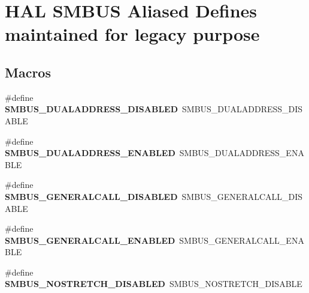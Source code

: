 \hypertarget{group___h_a_l___s_m_b_u_s___aliased___defines}{\section{H\-A\-L S\-M\-B\-U\-S Aliased Defines maintained for legacy purpose}
\label{group___h_a_l___s_m_b_u_s___aliased___defines}
}
\subsection*{Macros}
\begin{DoxyCompactItemize}
\item 
\hypertarget{group___h_a_l___s_m_b_u_s___aliased___defines_gaddbad34ded349c11686df6c08aa6471a}{\#define {\bfseries S\-M\-B\-U\-S\-\_\-\-D\-U\-A\-L\-A\-D\-D\-R\-E\-S\-S\-\_\-\-D\-I\-S\-A\-B\-L\-E\-D}~S\-M\-B\-U\-S\-\_\-\-D\-U\-A\-L\-A\-D\-D\-R\-E\-S\-S\-\_\-\-D\-I\-S\-A\-B\-L\-E}\label{group___h_a_l___s_m_b_u_s___aliased___defines_gaddbad34ded349c11686df6c08aa6471a}

\item 
\hypertarget{group___h_a_l___s_m_b_u_s___aliased___defines_ga40e0af7474fce8b9658f0bb0bd5dcdb5}{\#define {\bfseries S\-M\-B\-U\-S\-\_\-\-D\-U\-A\-L\-A\-D\-D\-R\-E\-S\-S\-\_\-\-E\-N\-A\-B\-L\-E\-D}~S\-M\-B\-U\-S\-\_\-\-D\-U\-A\-L\-A\-D\-D\-R\-E\-S\-S\-\_\-\-E\-N\-A\-B\-L\-E}\label{group___h_a_l___s_m_b_u_s___aliased___defines_ga40e0af7474fce8b9658f0bb0bd5dcdb5}

\item 
\hypertarget{group___h_a_l___s_m_b_u_s___aliased___defines_gac6c7ef3413e8533e140fda0f1c882a0e}{\#define {\bfseries S\-M\-B\-U\-S\-\_\-\-G\-E\-N\-E\-R\-A\-L\-C\-A\-L\-L\-\_\-\-D\-I\-S\-A\-B\-L\-E\-D}~S\-M\-B\-U\-S\-\_\-\-G\-E\-N\-E\-R\-A\-L\-C\-A\-L\-L\-\_\-\-D\-I\-S\-A\-B\-L\-E}\label{group___h_a_l___s_m_b_u_s___aliased___defines_gac6c7ef3413e8533e140fda0f1c882a0e}

\item 
\hypertarget{group___h_a_l___s_m_b_u_s___aliased___defines_ga395828b6264255bd2a51c17f3b473fea}{\#define {\bfseries S\-M\-B\-U\-S\-\_\-\-G\-E\-N\-E\-R\-A\-L\-C\-A\-L\-L\-\_\-\-E\-N\-A\-B\-L\-E\-D}~S\-M\-B\-U\-S\-\_\-\-G\-E\-N\-E\-R\-A\-L\-C\-A\-L\-L\-\_\-\-E\-N\-A\-B\-L\-E}\label{group___h_a_l___s_m_b_u_s___aliased___defines_ga395828b6264255bd2a51c17f3b473fea}

\item 
\hypertarget{group___h_a_l___s_m_b_u_s___aliased___defines_ga4fd6421c8f8dbb020249f49dd45a786e}{\#define {\bfseries S\-M\-B\-U\-S\-\_\-\-N\-O\-S\-T\-R\-E\-T\-C\-H\-\_\-\-D\-I\-S\-A\-B\-L\-E\-D}~S\-M\-B\-U\-S\-\_\-\-N\-O\-S\-T\-R\-E\-T\-C\-H\-\_\-\-D\-I\-S\-A\-B\-L\-E}\label{group___h_a_l___s_m_b_u_s___aliased___defines_ga4fd6421c8f8dbb020249f49dd45a786e}


\end{DoxyCompactItemize}

